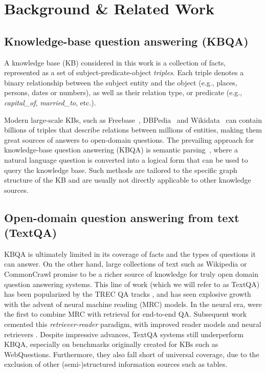 \documentclass[11pt]{article}
\begin{document}
 
\section{Background \& Related Work}

\subsection{Knowledge-base question answering (KBQA)}

A knowledge base (KB) considered in this work is a collection of facts, represented as a set of subject-predicate-object \emph{triples}.
Each triple  denotes a binary relationship between the subject entity  and the object  (e.g., places, persons, dates or numbers), as well as their relation type, or predicate  (e.g., \emph{capital\_of}, \emph{married\_to}, etc.).

Modern large-scale KBs, such as Freebase~\citep{bollacker2008freebase}, DBPedia~\citep{auer2007dbpedia} and Wikidata~\citep{vrandevcic2014wikidata} can contain billions of triples that describe relations between millions of entities, 
making them great sources of answers to open-domain questions.
The prevailing approach for knowledge-base question answering (KBQA) is semantic parsing~\citep{WebQ, yih2015semantic}, where a natural language question is converted into a logical form that can be used to query the knowledge base.
Such methods are tailored to the specific graph structure of the KB and are usually not directly applicable to other knowledge sources.


\subsection{Open-domain question answering from text (TextQA)}
KBQA is ultimately limited in its coverage of facts and the types of questions it can answer.  On the other hand, large collections of text such as Wikipedia or CommonCrawl promise to be a richer source of knowledge for truly open domain question answering systems.  This line of work (which we will refer to as TextQA) has been popularized by the TREC QA tracks \citep{voorhees-tice-2000-trec}, and has seen explosive growth with the advent of neural machine reading (MRC) \citep{rajpurkar-etal-2016-squad} models.  In the neural era, \citet{drqa} were the first to combine MRC with retrieval for end-to-end QA.  Subsequent work cemented this \emph{retriever-reader} paradigm, with improved reader models \citep{yang2019end, izacard-grave-2021-leveraging} and neural retrievers \citep{ORQA, REALM, DPR}.  Despite impressive advances, TextQA systems still underperform KBQA, especially on benchmarks originally created for KBs such as WebQuestions.  
Furthermore, they also fall short of universal coverage, due to the exclusion of other (semi-)structured information sources such as tables.
\end{document}
